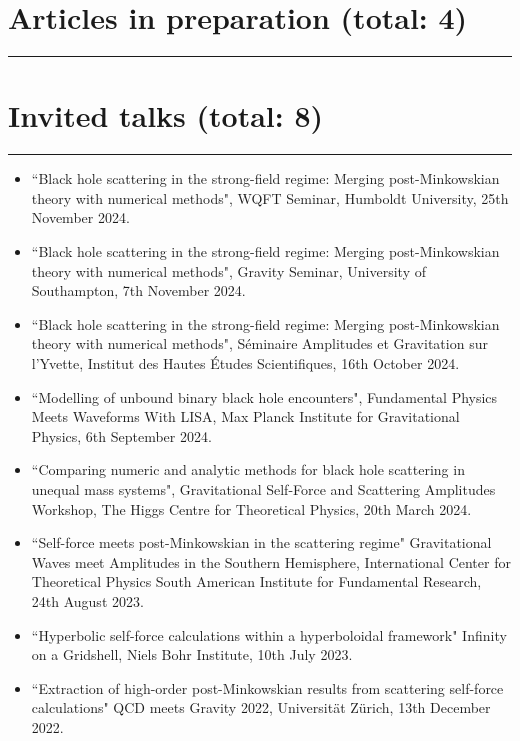 \documentclass[10.5pt, oneside]{article}   	%
\begin{document}
{\color{Sectioncolour} 
\section*{Articles in preparation {\rm (total: 4)}}
\vspace{-3mm}
\noindent\rule{\linewidth}{0.6pt}}

\vspace{-5mm}
\printbibliography[keyword={prep},title={~}]


 
  {\color{Sectioncolour}
\section*{Invited talks {\rm (total: 8)}}
\vspace{-3mm}
\noindent\rule{\linewidth}{0.6pt}}
\begin{itemize}
\item ``Black hole scattering in the strong-field regime: Merging post-Minkowskian theory with numerical methods", WQFT Seminar, Humboldt University, 25th November 2024.
\item ``Black hole scattering in the strong-field regime: Merging post-Minkowskian theory with numerical methods", Gravity Seminar, University of Southampton, 7th November 2024.
\item ``Black hole scattering in the strong-field regime: Merging post-Minkowskian theory with numerical methods", Séminaire Amplitudes et Gravitation sur l'Yvette, Institut des Hautes Études Scientifiques, 16th October 2024.
\item ``Modelling of unbound binary black hole encounters", Fundamental Physics Meets Waveforms With LISA, Max Planck Institute for Gravitational Physics, 6th September 2024.
\item ``Comparing numeric and analytic methods for black hole scattering in unequal mass systems", Gravitational Self-Force and Scattering Amplitudes Workshop, The Higgs Centre for Theoretical Physics, 20th March 2024.
\item ``Self-force meets post-Minkowskian in the scattering regime" Gravitational Waves meet Amplitudes in the Southern Hemisphere, International Center for Theoretical Physics South American Institute for Fundamental Research, 24th August 2023.
\item``Hyperbolic self-force calculations within a hyperboloidal framework" Infinity on a Gridshell, Niels Bohr Institute, 10th July 2023.
\item ``Extraction of high-order post-Minkowskian results from scattering self-force calculations" QCD meets Gravity 2022, Universität Zürich, 13th December 2022.
\end{itemize} 
 
\end{document}
